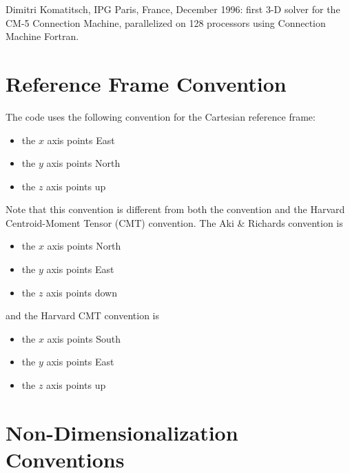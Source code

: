 \documentclass[oneside,english]{book}
\begin{document}
 Dimitri Komatitsch, IPG Paris, France, December 1996: first 3-D solver for the CM-5 Connection Machine,
    parallelized on 128 processors using Connection Machine Fortran.\\

{\small 
}{\small \par}

\appendix

\chapter{\label{cha:Reference-Frame-Convention}Reference Frame Convention}

The code uses the following convention for the Cartesian reference frame:

\begin{itemize}
\item the $x$ axis points East
\item the $y$ axis points North
\item the $z$ axis points up
\end{itemize}
Note that this convention is different from both the \citet{AkRi80}
convention and the Harvard Centroid-Moment Tensor (CMT) convention.
The Aki \& Richards convention is

\begin{itemize}
\item the $x$ axis points North
\item the $y$ axis points East
\item the $z$ axis points down
\end{itemize}
and the Harvard CMT convention is

\begin{itemize}
\item the $x$ axis points South
\item the $y$ axis points East
\item the $z$ axis points up
\end{itemize}

\chapter{\label{cha:Non-Dimensionalization-Conventions}Non-Dimensionalization
Conventions{\small{} }}
\end{document}
